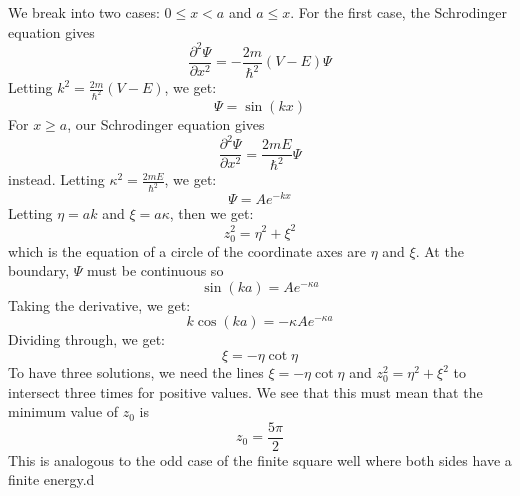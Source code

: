 \begin{sol}
We break into two cases: $0\le x < a$ and $a \le x$. For the first case, the Schrodinger equation gives
$$\frac{\partial^2 \Psi}{\partial x^2} = -\frac{2m}{\hbar^2}(V-E)\Psi$$
Letting $k^2=\frac{2m}{\hbar^2}(V-E)$, we get:
$$\Psi = \sin(kx)$$
For $x\ge a$, our Schrodinger equation gives
$$\frac{\partial^2 \Psi}{\partial x^2} = \frac{2mE}{\hbar^2}\Psi$$
instead. Letting $\kappa^2=\frac{2mE}{\hbar^2}$, we get:
$$\Psi = Ae^{-kx}$$
Letting $\eta=ak$ and $\xi=a\kappa$, then we get:
$$z_0^2=\eta^2+\xi^2$$
which is the equation of a circle of the coordinate axes are $\eta$ and $\xi$.
At the boundary, $\Psi$ must be continuous so
$$\sin(ka)=Ae^{-\kappa a}$$
Taking the derivative, we get:
$$k\cos(ka)=-\kappa Ae^{-\kappa a}$$
Dividing through, we get:
$$\xi=-\eta \cot \eta$$
To have three solutions, we need the lines $\xi=-\eta \cot \eta$ and $z_0^2=\eta^2+\xi^2$ to intersect three times for positive values. We see that this must mean that the minimum value of $z_0$ is
$$z_0=\frac{5\pi}{2}$$
This is analogous to the odd case of the finite square well where both sides have a finite energy.d
\end{sol}